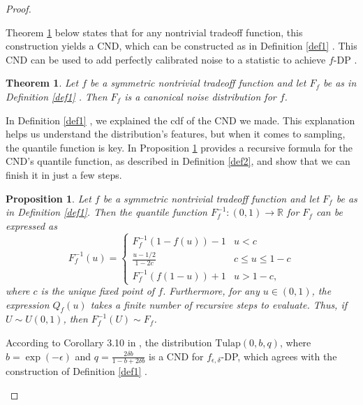 \documentclass{article}
\newtheorem{thm}{Theorem}
\newtheorem{prop}{Proposition}
\begin{document}
\begin{proof}
\begin{enumerate}
    Theorem \ref{thm1} \parencite{awan2023canonical} below states that for any nontrivial tradeoff function, this construction yields a CND, which can be constructed as in Definition \ref{def1} \parencite{awan2023canonical}. This CND can be used to add perfectly calibrated noise to a statistic to achieve $f$-DP \parencite{dong2019gaussian}. 
    
    \begin{thm} \label{thm1}  %
    Let $f$ be a symmetric nontrivial tradeoff function and let $F_f$ be as in Definition \ref{def1} \parencite{awan2023canonical}. Then $F_f$ is a canonical noise distribution for $f$. 
    \end{thm}
    
    In Definition \ref{def1} \parencite{awan2023canonical}, we explained the cdf of the CND we made. This explanation helps us understand the distribution's features, but when it comes to sampling, the quantile function is key. In Proposition \ref{prop1} \parencite{awan2023canonical} provides a recursive formula for the CND's quantile function, as described in Definition \ref{def2}\parencite{awan2023canonical}, and show that we can finish it in just a few steps.

    \begin{prop}\label{prop1}   %
      Let $f$ be a symmetric nontrivial tradeoff function and let $F_f$ be as in Definition \ref{def1}. Then the quantile function $F_f^{-1}:(0,1)\rightarrow \mathbb{R}$ for $F_f$ can be expressed as
      \[F_f^{-1}(u) = \begin{cases}
      F_f^{-1}(1-f(u))-1&u<c\\
      \frac{u-1/2}{1-2c}&c\leq u\leq 1-c\\
      F_f^{-1}(f(1-u))+1&u>1-c,
      \end{cases}\]
      where $c$ is the unique fixed point of $f$. {Furthermore, for any $u\in (0,1)$, the expression $Q_f(u)$ takes a finite number of recursive steps to evaluate. Thus,} if $U\sim U(0,1)$, then $F_f^{-1}(U) \sim F_f$. 
    \end{prop}
    
    According to Corollary 3.10 in \cite{awan2023canonical}, 
    the distribution $\mathrm{Tulap}(0,b,q)$, where $b=\exp(-\epsilon)$ and $q = \frac{2\delta b}{1-b+2\delta b}$ 
    is a CND for $f_{\epsilon,\delta}$-DP, which agrees with the construction of Definition \ref{def1} \parencite{awan2023canonical}. 
    

\end{enumerate}
\end{proof}
\end{document}
